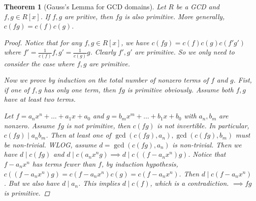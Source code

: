 \documentclass[a4paper]{article}
\theoremstyle{mystyle}
\newtheorem{theorem}{Theorem}
\begin{document}
\begin{theorem}[Gauss's Lemma for GCD domains]
  Let $R$ be a GCD and $f, g \in R[x]$. If $f, g$ are pritive, then $fg$
  is also primitive. More generally, $c(fg) = c(f)c(g)$.
  \begin{proof}
    Notice that for any $f, g \in R[x]$, we have
    $c(fg) = c(f)c(g)c(f'g')$ where $f' = \frac{1}{c(f)} f, g' = \frac{1}{c(g)} g$.
    Clearly $f', g'$ are primitive. So we only need to consider the case where
    $f, g$ are primitive.

    Now we prove by induction on the total number of nonzero terms of $f$ and $g$.
    Fist, if one of $f, g$ has only one term, then $fg$ is primitive obviously.
    Assume both $f, g$ have at least two terms.

    Let $f = a_n x^n + \dots + a_1 x + a_0$ and
    $g = b_m x^m + \dots + b_1 x + b_0$ with $a_n, b_m$ are nonzero.
    Assume $fg$ is not primitive, then $c(fg)$ is not invertible.
    In particular, $c(fg) \mid a_n b_m$. Then at least one of
    $\gcd(c(fg), a_n), \gcd(c(fg), b_m)$
    must be non-trivial. WLOG, assume $d = \gcd(c(fg), a_n)$ is non-trivial.
    Then we have $d \mid c(fg)$ and $d \mid c( a_nx^n g ) \implies
    d \mid c( (f - a_nx^n) g)$. Notice that $f - a_n x^n$ has terms fewer than
    $f$, by induction hypothesis, $c( (f - a_nx^n) g) = c(f - a_n x^n) c(g)
    = c(f - a_n x^n)$. Then $d \mid c(f - a_n x^n)$. But we also have $d \mid a_n$.
    This implies $d \mid c(f)$, which is a contradiction.
    $\implies fg$ is primitive.
  \end{proof}
\end{theorem}

% 
% 
\end{document}

